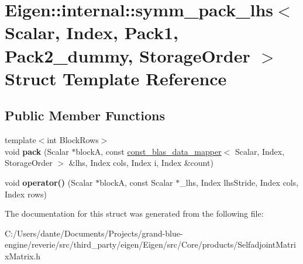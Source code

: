 \hypertarget{struct_eigen_1_1internal_1_1symm__pack__lhs}{}\section{Eigen\+::internal\+::symm\+\_\+pack\+\_\+lhs$<$ Scalar, Index, Pack1, Pack2\+\_\+dummy, Storage\+Order $>$ Struct Template Reference}
\label{struct_eigen_1_1internal_1_1symm__pack__lhs}
\subsection*{Public Member Functions}
\begin{DoxyCompactItemize}
\item 
\mbox{\label{struct_eigen_1_1internal_1_1symm__pack__lhs_aad8bf0f72a54a95ee37e79f74c603fd5}} 
{\footnotesize template$<$int Block\+Rows$>$ }\\void {\bfseries pack} (Scalar $\ast$blockA, const \mbox{\hyperlink{class_eigen_1_1internal_1_1const__blas__data__mapper}{const\+\_\+blas\+\_\+data\+\_\+mapper}}$<$ Scalar, Index, Storage\+Order $>$ \&lhs, Index cols, Index i, Index \&count)
\item 
\mbox{\label{struct_eigen_1_1internal_1_1symm__pack__lhs_ae6a09da9a1adb8a1d9d0f3dc3c632d2e}} 
void {\bfseries operator()} (Scalar $\ast$blockA, const Scalar $\ast$\+\_\+lhs, Index lhs\+Stride, Index cols, Index rows)
\end{DoxyCompactItemize}


The documentation for this struct was generated from the following file\+:\begin{DoxyCompactItemize}
\item 
C\+:/\+Users/dante/\+Documents/\+Projects/grand-\/blue-\/engine/reverie/src/third\+\_\+party/eigen/\+Eigen/src/\+Core/products/Selfadjoint\+Matrix\+Matrix.\+h\end{DoxyCompactItemize}
